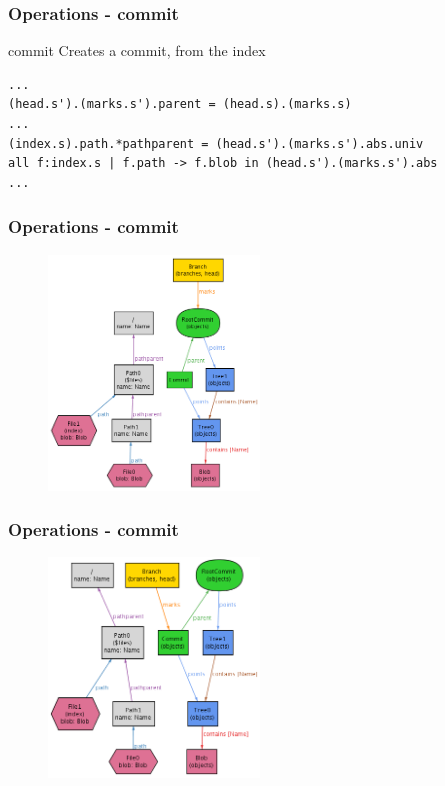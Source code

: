 \documentclass{beamer}
\begin{document}
\begin{frame}[fragile]
   \frametitle{Operations - commit}
   \begin{block}{commit}
      Creates a commit, from the index
   \end{block}
   \tiny
   \begin{lstlisting}
...
(head.s').(marks.s').parent = (head.s).(marks.s)
...
(index.s).path.*pathparent = (head.s').(marks.s').abs.univ
all f:index.s | f.path -> f.blob in (head.s').(marks.s').abs
...
   \end{lstlisting}
\end{frame}

\begin{frame}[fragile]
   \frametitle{Operations - commit}
   \begin{figure}
      \centering
      \includegraphics[width=0.5\textwidth]{images/commit1.png}
   \end{figure}
\end{frame}

\begin{frame}[fragile]
   \frametitle{Operations - commit}
   \begin{figure}
      \centering
      \includegraphics[width=0.5\textwidth]{images/commit2.png}
   \end{figure}
\end{frame}
\end{document}
